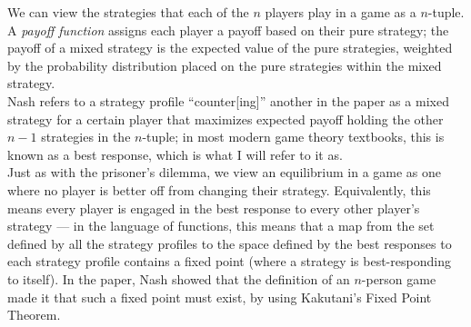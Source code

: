 \documentclass[12pt]{extarticle}
\begin{document}
  We can view the strategies that each of the $n$ players play in a game as a $n$-tuple. A \textit{payoff function} assigns each player a payoff based on their pure strategy; the payoff of a mixed strategy is the expected value of the pure strategies, weighted by the probability distribution placed on the pure strategies within the mixed strategy.\\

  Nash refers to a strategy profile ``counter[ing]'' another in the paper as a mixed strategy for a certain player that maximizes expected payoff holding the other $n-1$ strategies in the $n$-tuple; in most modern game theory textbooks, this is known as a best response,\supercite{tadelis_game_2023} which is what I will refer to it as.\\

  Just as with the prisoner's dilemma, we view an equilibrium in a game as one where no player is better off from changing their strategy. Equivalently, this means every player is engaged in the best response to every other player's strategy --- in the language of functions, this means that a map from the set defined by all the strategy profiles to the space defined by the best responses to each strategy profile contains a fixed point (where a strategy is best-responding to itself). In the paper, Nash showed that the definition of an $n$-person game made it that such a fixed point must exist, by using Kakutani's Fixed Point Theorem.\\
\end{document}
